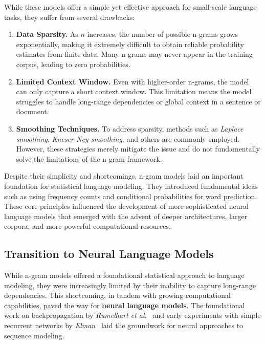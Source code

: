 \noindent
While these models offer a simple yet effective approach for small-scale language tasks, they suffer from several drawbacks:
\begin{enumerate}
    \item \textbf{Data Sparsity.} As $n$ increases, the number of possible n-grams grows exponentially, making it extremely difficult to obtain reliable probability estimates from finite data. Many n-grams may never appear in the training corpus, leading to zero probabilities.
    \item \textbf{Limited Context Window.} Even with higher-order n-grams, the model can only capture a short context window. This limitation means the model struggles to handle long-range dependencies or global context in a sentence or document.
    \item \textbf{Smoothing Techniques.} To address sparsity, methods such as \emph{Laplace smoothing}, \emph{Kneser-Ney smoothing}, and others are commonly employed. However, these strategies merely mitigate the issue and do not fundamentally solve the limitations of the n-gram framework.
\end{enumerate}

\noindent
Despite their simplicity and shortcomings, n-gram models laid an important foundation for statistical language modeling. They introduced fundamental ideas such as using frequency counts and conditional probabilities for word prediction. These core principles influenced the development of more sophisticated neural language models that emerged with the advent of deeper architectures, larger corpora, and more powerful computational resources.

\subsection{Transition to Neural Language Models}
\label{sec:transition_nn_models}

\noindent
While n-gram models offered a foundational statistical approach to language modeling, they were increasingly limited by their inability to capture long-range dependencies. This shortcoming, in tandem with growing computational capabilities, paved the way for \textbf{neural language models}. The foundational work on backpropagation by \emph{Rumelhart et al.}~\cite{rumelhart1986learning} and early experiments with simple recurrent networks by \emph{Elman}~\cite{elman1990finding} laid the groundwork for neural approaches to sequence modeling.

